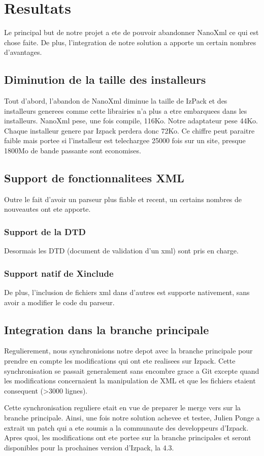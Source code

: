\section{Resultats}
Le principal but de notre projet a ete de pouvoir abandonner NanoXml ce qui est chose faite. De plus, l'integration de notre solution a apporte un certain nombres d'avantages.
\subsection{Diminution de la taille des installeurs}
Tout d'abord, l'abandon de NanoXml diminue la taille de IzPack et des installeurs generees comme cette librairies n'a plus a etre embarquees dans les installeurs. NanoXml pese, une fois compile, 116Ko. Notre adaptateur pese 44Ko. Chaque installeur genere par Izpack perdera donc 72Ko. Ce chiffre peut paraitre faible mais portee si l'installeur est telechargee 25000 fois sur un site, presque 1800Mo de bande passante sont economises.
\subsection{Support de fonctionnalitees XML}
Outre le fait d'avoir un parseur plus fiable et recent, un certains nombres de nouveautes ont ete apporte.
\subsubsection{Support de la DTD}
Desormais les DTD (document de validation d'un xml) sont pris en charge.
\subsubsection{Support natif de Xinclude}
De plus, l'inclusion de fichiers xml dans d'autres est supporte nativement, sans avoir a modifier le code du parseur.
\subsection{Integration dans la branche principale}
Regulierement, nous synchronisions notre depot avec la branche principale pour prendre en compte les modifications qui ont ete realisees sur Izpack. Cette synchronisation se passait generalement sans encombre grace a Git excepte quand les modifications concernaient la manipulation de XML et que les fichiers etaient consequent (>3000 lignes).

Cette synchronisation reguliere etait en vue de preparer le merge vers sur la branche principale. Ainsi, une fois notre solution achevee et testee, Julien Ponge a extrait un patch qui a ete soumis a la communaute des developpeurs d'Izpack. Apres quoi, les modifications ont ete portee sur la branche principales et seront disponibles pour la prochaines version d'Izpack, la 4.3.
